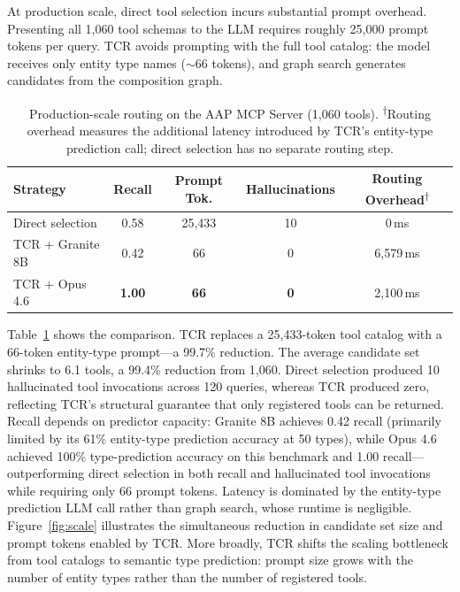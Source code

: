 \documentclass{article}
\begin{document}
At production scale, direct tool selection incurs substantial prompt overhead. Presenting all 1,060 tool schemas to the LLM requires roughly 25,000 prompt tokens per query. TCR avoids prompting with the full tool catalog: the model receives only entity type names (${\sim}$66 tokens), and graph search generates candidates from the composition graph.

\begin{table}[htbp]
  \centering
  \caption{Production-scale routing on the AAP MCP Server (1,060 tools). \textsuperscript{$\dagger$}Routing overhead measures the additional latency introduced by TCR's entity-type prediction call; direct selection has no separate routing step.}
  \label{tab:production}
  \begin{tabular}{lcccc}
    \toprule
    \textbf{Strategy} & \textbf{Recall} & \textbf{Prompt Tok.} & \textbf{Hallucinations} & \textbf{Routing Overhead}\textsuperscript{$\dagger$} \\
    \midrule
    Direct selection         & 0.58          & 25,433  & 10  & 0\,ms      \\
    TCR + Granite 8B         & 0.42          & 66      & 0   & 6,579\,ms  \\
    TCR + Opus 4.6            & \textbf{1.00} & \textbf{66} & \textbf{0} & 2,100\,ms  \\
    \bottomrule
  \end{tabular}
\end{table}

Table~\ref{tab:production} shows the comparison. TCR replaces a 25,433-token tool catalog with a 66-token entity-type prompt---a 99.7\% reduction. The average candidate set shrinks to 6.1 tools, a 99.4\% reduction from 1,060. Direct selection produced 10 hallucinated tool invocations across 120 queries, whereas TCR produced zero, reflecting TCR's structural guarantee that only registered tools can be returned. Recall depends on predictor capacity: Granite 8B achieves 0.42 recall (primarily limited by its 61\% entity-type prediction accuracy at 50 types), while Opus 4.6 achieved 100\% type-prediction accuracy on this benchmark and 1.00 recall---outperforming direct selection in both recall and hallucinated tool invocations while requiring only 66 prompt tokens. Latency is dominated by the entity-type prediction LLM call rather than graph search, whose runtime is negligible. Figure~\ref{fig:scale} illustrates the simultaneous reduction in candidate set size and prompt tokens enabled by TCR. More broadly, TCR shifts the scaling bottleneck from tool catalogs to semantic type prediction: prompt size grows with the number of entity types rather than the number of registered tools.
\end{document}
